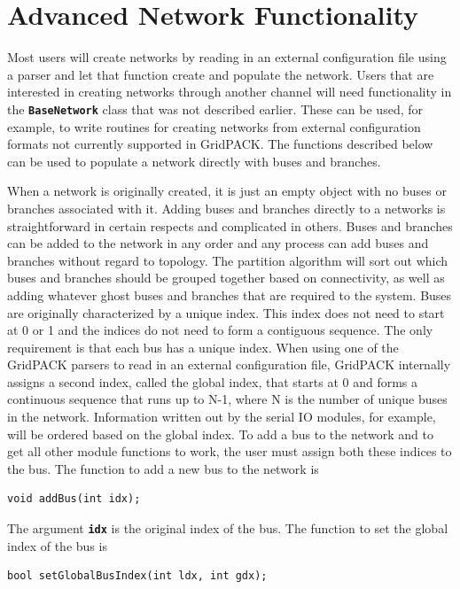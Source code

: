 \section{Advanced Network Functionality}

Most users will create networks by reading in an external configuration file using a parser and let that function create and populate the network. Users that are interested in creating networks through another channel will need functionality in the \texttt{\textbf{BaseNetwork}} class that was not described earlier. These can be used, for example, to write routines for creating networks from external configuration formats not currently supported in GridPACK. The functions described below can be used to populate a network directly with buses and branches.

When a network is originally created, it is just an empty object with no buses or branches associated with it. Adding buses and branches directly to a networks is straightforward in certain respects and complicated in others. Buses and branches can be added to the network in any order and any process can add buses and branches without regard to topology. The partition algorithm will sort out which buses and branches should be grouped together based on connectivity, as well as adding whatever ghost buses and branches that are required to the system. Buses are originally characterized by a unique index. This index does not need to start at 0 or 1 and the indices do not need to form a contiguous sequence. The only requirement is that each bus has a unique index. When using one of the GridPACK parsers to read in an external configuration file, GridPACK internally assigns a second index, called the global index, that starts at 0 and forms a continuous sequence that runs up to N-1, where N is the number of unique buses in the network. Information written out by the serial IO modules, for example, will be ordered based on the global index. To add a bus to the network and to get all other module functions to work, the user must assign both these indices to the bus. The function to add a new bus to the network is

{
\color{red}
\begin{Verbatim}[fontseries=b]
void addBus(int idx);
\end{Verbatim}
}

The argument \texttt{\textbf{idx}} is the original index of the bus. The function to set the global index of the bus is

{
\color{red}
\begin{Verbatim}[fontseries=b]
bool setGlobalBusIndex(int ldx, int gdx);
\end{Verbatim}
}

